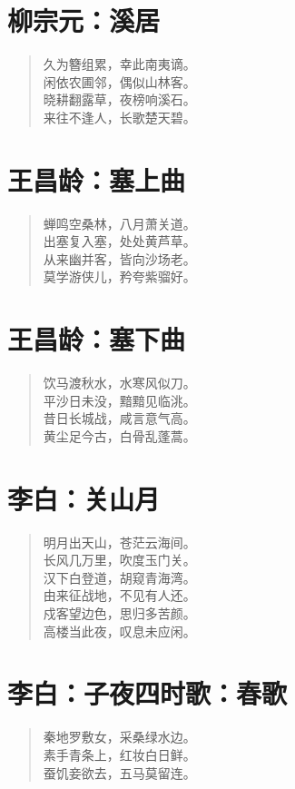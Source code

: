 \documentclass[12pt,oneside]{book}
\newenvironment{shici}{%
\begin{verse}\centering\yanti\large\hspace{12pt}}{\end{verse}}
\begin{document}
\begin{common-format}
\chapter{柳宗元：溪居}
\begin{shici}
久为簪组累，幸此南夷谪。\\
闲依农圃邻，偶似山林客。\\
晓耕翻露草，夜榜响溪石。\\
来往不逢人，长歌楚天碧。
\end{shici}

\chapter{王昌龄：塞上曲}
\begin{shici}
蝉鸣空桑林，八月萧关道。\\
出塞复入塞，处处黄芦草。\\
从来幽并客，皆向沙场老。\\
莫学游侠儿，矜夸紫骝好。
\end{shici}


\chapter{王昌龄：塞下曲}
\begin{shici}
饮马渡秋水，水寒风似刀。\\
平沙日未没，黯黯见临洮。\\
昔日长城战，咸言意气高。\\
黄尘足今古，白骨乱蓬蒿。
\end{shici}

\chapter{李白：关山月}
\begin{shici}
明月出天山，苍茫云海间。\\
长风几万里，吹度玉门关。\\
汉下白登道，胡窥青海湾。\\
由来征战地，不见有人还。\\
戍客望边色，思归多苦颜。\\
高楼当此夜，叹息未应闲。
\end{shici}

\chapter{李白：子夜四时歌：春歌}
\begin{shici}
秦地罗敷女，采桑绿水边。\\
素手青条上，红妆白日鲜。\\
蚕饥妾欲去，五马莫留连。
\end{shici}


\end{common-format}
\end{document}
